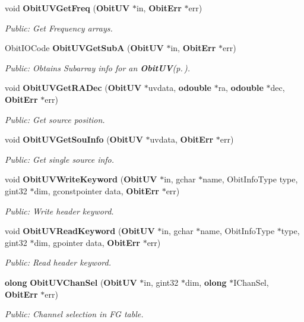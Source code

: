 \begin{CompactItemize}
void {\bf Obit\-UVGet\-Freq} ({\bf Obit\-UV} $\ast$in, {\bf Obit\-Err} $\ast$err)
\begin{CompactList}\small\item\em Public: Get Frequency arrays. \item\end{CompactList}\item 
Obit\-IOCode {\bf Obit\-UVGet\-Sub\-A} ({\bf Obit\-UV} $\ast$in, {\bf Obit\-Err} $\ast$err)
\begin{CompactList}\small\item\em Public: Obtains Subarray info for an {\bf Obit\-UV}{\rm (p.\,\pageref{structObitUV})}. \item\end{CompactList}\item 
void {\bf Obit\-UVGet\-RADec} ({\bf Obit\-UV} $\ast$uvdata, {\bf odouble} $\ast$ra, {\bf odouble} $\ast$dec, {\bf Obit\-Err} $\ast$err)
\begin{CompactList}\small\item\em Public: Get source position. \item\end{CompactList}\item 
void {\bf Obit\-UVGet\-Sou\-Info} ({\bf Obit\-UV} $\ast$uvdata, {\bf Obit\-Err} $\ast$err)
\begin{CompactList}\small\item\em Public: Get single source info. \item\end{CompactList}\item 
void {\bf Obit\-UVWrite\-Keyword} ({\bf Obit\-UV} $\ast$in, gchar $\ast$name, Obit\-Info\-Type type, gint32 $\ast$dim, gconstpointer data, {\bf Obit\-Err} $\ast$err)
\begin{CompactList}\small\item\em Public: Write header keyword. \item\end{CompactList}\item 
void {\bf Obit\-UVRead\-Keyword} ({\bf Obit\-UV} $\ast$in, gchar $\ast$name, Obit\-Info\-Type $\ast$type, gint32 $\ast$dim, gpointer data, {\bf Obit\-Err} $\ast$err)
\begin{CompactList}\small\item\em Public: Read header keyword. \item\end{CompactList}\item 
{\bf olong} {\bf Obit\-UVChan\-Sel} ({\bf Obit\-UV} $\ast$in, gint32 $\ast$dim, {\bf olong} $\ast$IChan\-Sel, {\bf Obit\-Err} $\ast$err)
\begin{CompactList}\small\item\em Public: Channel selection in FG table. \item\end{CompactList}\end{CompactItemize}


